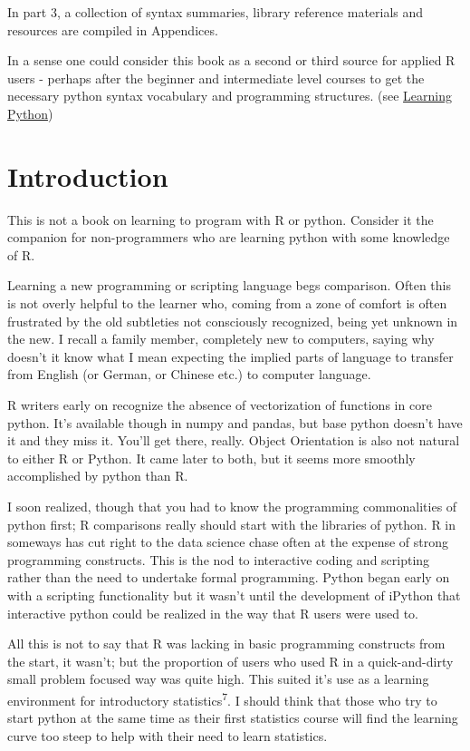 \documentclass[]{book}
\theoremstyle{definition}
\theoremstyle{definition}
\theoremstyle{definition}
\theoremstyle{remark}
\begin{document}
In part 3, a collection of syntax summaries, library reference materials
and resources are compiled in Appendices.

In a sense one could consider this book as a second or third source for
applied R users  - perhaps after the beginner and
intermediate level courses to get the necessary python syntax vocabulary
and programming structures. (see
\href{references.html\#Lutz-Mark-Learning-\%20Python-4th-Ed-OReilly-Media-Sebastopol-CA-2009}{Learning
Python})

\chapter{Introduction}\label{introduction}

This is not a book on learning to program with R or python. Consider it
the companion for non-programmers who are learning python
with some knowledge of R.

Learning a new programming or scripting language begs comparison. Often
this is not overly helpful to the learner who, coming from a zone of
comfort is often frustrated by the old subtleties not consciously
recognized, being yet unknown in the new. I recall a family member,
completely new to computers, saying why doesn't it know what I mean
expecting the implied parts of language to transfer from English (or
German, or Chinese etc.) to computer language.

R writers early on recognize the absence of vectorization of functions
in core python. It's available though in numpy and pandas, but base
python doesn't have it and they miss it. You'll get there, really.
Object Orientation is also not natural to either R or Python. It came
later to both, but it seems more smoothly accomplished by python than R.

I soon realized, though that you had to know the programming
commonalities of python first; R comparisons really should start with
the libraries of python. R in someways has cut right to the data science
chase often at the expense of strong programming constructs. This is the
nod to interactive coding and scripting rather than the need to
undertake formal programming. Python began early on with a scripting
functionality but it wasn't until the development of iPython that
interactive python could be realized in the way that R users were used
to.

All this is not to say that R was lacking in basic programming
constructs from the start, it wasn't; but the proportion of users who
used R in a quick-and-dirty small problem focused way was quite high.
This suited it's use as a learning environment for introductory
statistics\textsuperscript{7}. I should think that those who try to
start python at the same time as their first statistics course will find
the learning curve too steep to help with their
need to learn statistics.
\end{document}

